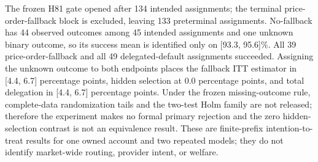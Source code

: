 The frozen H81 gate opened after 134 intended assignments; the terminal price-order-fallback block is excluded, leaving 133 preterminal assignments.
No-fallback has 44 observed outcomes among 45 intended assignments and one unknown binary outcome, so its success mean is identified only on [93.3, 95.6]\%. All 39 price-order-fallback and all 49 delegated-default assignments succeeded.
Assigning the unknown outcome to both endpoints places the fallback ITT estimator in [4.4, 6.7] percentage points, hidden selection at 0.0 percentage points, and total delegation in [4.4, 6.7] percentage points.
Under the frozen missing-outcome rule, complete-data randomization tails and the two-test Holm family are not released; therefore the experiment makes no formal primary rejection and the zero hidden-selection contrast is not an equivalence result.
These are finite-prefix intention-to-treat results for one owned account and two repeated models; they do not identify market-wide routing, provider intent, or welfare.
